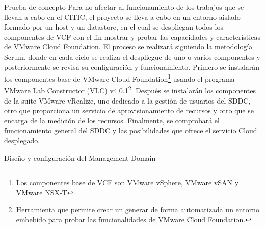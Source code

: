 \begin{section}{Prueba de concepto}
    \label{subsect:prueba-concepto}
Para no afectar al funcionamiento de los trabajos que se llevan a cabo en el CITIC, el proyecto se lleva a cabo en un entorno aislado formado por un host y un datastore, en el cual se despliegan todos los componentes de VCF con el fin mostrar y probar las capacidades y características de VMware Cloud Foundation. 
El proceso se realizará siguiendo la metodología Scrum, donde en cada ciclo se realiza el despliegue de uno o varios componentes y posteriormente se revisa su configuración y funcionamiento. Primero se instalarán los componentes base de VMware Cloud Foundation\footnote{Los componentes base de VCF son VMware vSphere, VMware vSAN y VMware NSX-T} usando el programa VMware Lab Constructor (VLC) v4.0.1\footnote{Herramienta que permite crear un generar de forma automatizada un entorno embebido para probar las funcionalidades de VMware Cloud Foundation.}. Después se instalarán los componentes de la suite VMware vRealize, uno dedicado a la gestión de usuarios del SDDC, otro que proporciona un servicio de aprovisionamiento de recursos y otro que se encarga de la medición de los recursos. Finalmente, se comprobará el funcionamiento general del SDDC y las posibilidades que ofrece el servicio Cloud desplegado.



\begin{subsection}{Diseño y configuración del Management Domain}


\end{subsection}


\end{section}